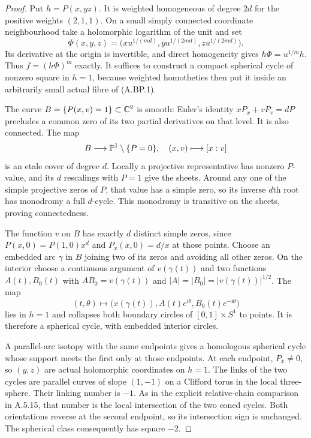 \begin{proof}
Put $h=P(x,yz)$. It is weighted homogeneous of degree
$2d$ for the positive weights $(2,1,1)$.
On a small simply connected coordinate neighbourhood
take a holomorphic logarithm of the unit and set
\[
 \Phi(x,y,z)=\bigl(xu^{1/(md)},
                  yu^{1/(2md)},zu^{1/(2md)}\bigr).
                                                        \tag{A.BP.2}
\]
Its derivative at the origin is invertible, and direct
homogeneity gives $h\Phi=u^{1/m}h$. Thus
$f=(h\Phi)^m$ exactly. It suffices to construct a
compact spherical cycle of nonzero square in $h=1$,
because weighted homotheties then put it inside an
arbitrarily small actual fibre of (A.BP.1).

The curve $B=\{P(x,v)=1\}\subset\mathbb C^2$ is smooth:
Euler's identity $xP_x+vP_v=dP$ precludes a common
zero of its two partial derivatives on that level.
It is also connected. The map
\[
 B\longrightarrow\mathbb P^1\setminus\{P=0\},
                       \quad(x,v)\longmapsto[x:v]
\]
is an etale cover of degree $d$. Locally a projective
representative has nonzero $P$-value, and its $d$
rescalings with $P=1$ give the sheets. Around any
one of the simple projective zeros of $P$, that
value has a simple zero, so its inverse $d$th root
has monodromy a full $d$-cycle. This monodromy is
transitive on the sheets, proving connectedness.

The function $v$ on $B$ has exactly $d$ distinct
simple zeros, since
$P(x,0)=P(1,0)x^d$ and $P_x(x,0)=d/x$ at those
points. Choose an embedded arc $\gamma$ in $B$
joining two of its zeros and avoiding all other
zeros. On the interior choose a continuous argument
of $v(\gamma(t))$ and two functions $A(t),B_0(t)$
with $A B_0=v(\gamma(t))$ and
$|A|=|B_0|=|v(\gamma(t))|^{1/2}$.
The map
\[
 (t,\theta)\longmapsto
   \bigl(x(\gamma(t)),A(t)e^{\mathrm i\theta},
                        B_0(t)e^{-\mathrm i\theta}\bigr)
                                                        \tag{A.BP.3}
\]
lies in $h=1$ and collapses both boundary circles
of $[0,1]\times S^1$ to points. It is therefore a
spherical cycle, with embedded interior circles.

A parallel-arc isotopy with the same endpoints gives
a homologous spherical cycle whose support meets
the first only at those endpoints. At each endpoint,
$P_x\ne0$, so $(y,z)$ are actual holomorphic
coordinates on $h=1$. The links of the two cycles
are parallel curves of slope $(1,-1)$ on a Clifford
torus in the local three-sphere. Their linking
number is $-1$. As in the explicit relative-chain
comparison in A.5.15, that number is the local
intersection of the two coned cycles. Both
orientations reverse at the second endpoint,
so its intersection sign is unchanged. The
spherical class consequently has square $-2$.


\end{proof}
